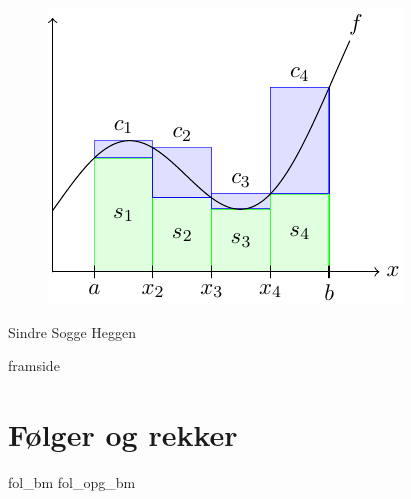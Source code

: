




\addto\captionsenglish{\renewcommand{\figurename}{Figur}}
\makeatletter
\addto\captionsenglish{\renewcommand{\chaptername}{Kapittel}}
\addto\captionsenglish{\renewcommand{\contentsname}{Innhold}}



	
	\pagecolor{blue!20}
	
	\begin{titlepage}
		\begin{center}
			\vspace*{1cm}
			
			{}
			
			\vspace{2.45cm} 
			\begin{figure}[H]
				\centering
				\qquad\includegraphics[scale=1.8]{fig/frpg}
			\end{figure}           
			\vspace{2 cm}
			\raggedleft Sindre Sogge Heggen   \end{center}
	\end{titlepage}
	\pagecolor{white}
\newpage
\phantom{}
\thispagestyle{empty}	
\newpage	
{framside}
\newpage

\footnotesize
\tableofcontents
\normalsize
\chapter{Følger og rekker\label{Folgerogrekker}}
\vspace{20pt}
{fol_bm}
\newpage
{fol_opg_bm}

